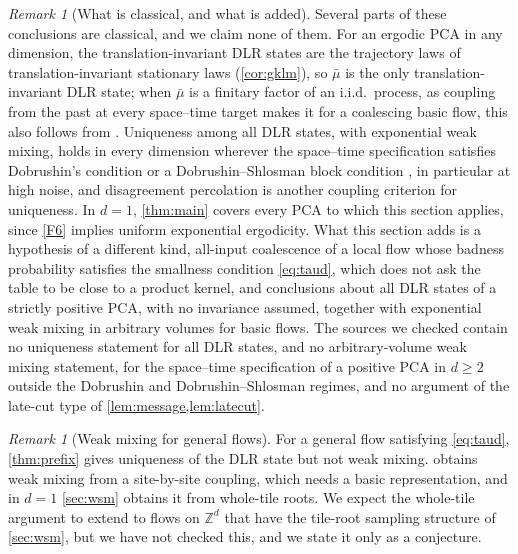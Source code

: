 \documentclass[11pt]{article}
\theoremstyle{plain}
\theoremstyle{definition}
\theoremstyle{remark}
\newtheorem{remark}[theorem]{Remark}
\newcommand{\Z}{\mathbb{Z}}
\newcommand{\ba}{\bar{\mu}}
\begin{document}
\begin{remark}[What is classical, and what is added]
\label{rem:higher-credit}
Several parts of these conclusions are classical, and we claim none of them. For an ergodic PCA in any dimension, the translation-invariant DLR states are the trajectory laws of translation-invariant stationary laws \cite{GKLM89} (\cref{cor:gklm}), so $\ba$ is the only translation-invariant DLR state; when $\ba$ is a finitary factor of an i.i.d.\ process, as coupling from the past \cite{PW96} at every space--time target makes it for a coalescing basic flow, this also follows from \cite[Theorem~2.1]{vdBS99}. Uniqueness among all DLR states, with exponential weak mixing, holds in every dimension wherever the space--time specification satisfies Dobrushin's condition \cite{Dob68} or a Dobrushin--Shlosman block condition \cite{DS85,Weitz05}, in particular at high noise, and disagreement percolation \cite{vdBM94} is another coupling criterion for uniqueness. In $d=1$, \cref{thm:main} covers every PCA to which this section applies, since \ref{F6} implies uniform exponential ergodicity. What this section adds is a hypothesis of a different kind, all-input coalescence of a local flow whose badness probability satisfies the smallness condition \eqref{eq:taud}, which does not ask the table to be close to a product kernel, and conclusions about all DLR states of a strictly positive PCA, with no invariance assumed, together with exponential weak mixing in arbitrary volumes for basic flows. The sources we checked contain no uniqueness statement for all DLR states, and no arbitrary-volume weak mixing statement, for the space--time specification of a positive PCA in $d\ge2$ outside the Dobrushin and Dobrushin--Shlosman regimes, and no argument of the late-cut type of \cref{lem:message,lem:latecut}.
\end{remark}

\begin{remark}[Weak mixing for general flows]
\label{rem:tilegeneral}
For a general flow satisfying \eqref{eq:taud}, \cref{thm:prefix} gives uniqueness of the DLR state but not weak mixing.  obtains weak mixing from a site-by-site coupling, which needs a basic representation, and in $d=1$ \cref{sec:wsm} obtains it from whole-tile roots. We expect the whole-tile argument to extend to flows on $\Z^d$ that have the tile-root sampling structure of \cref{sec:wsm}, but we have not checked this, and we state it only as a conjecture.
\end{remark}
\end{document}

